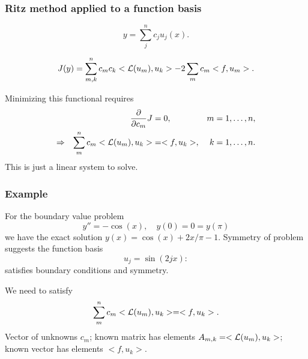 \documentclass{beamer}
\newcommand{\pda}[2]{\frac{\partial{#1}}{\partial{#2}}}
\begin{document}
\begin{frame}
  \frametitle{Ritz method applied to a function basis}

  \begin{equation*}
    y = \sum_j^n c_j u_j(x).
  \end{equation*}

  \begin{equation*}
    J(y) = \sum_{m,k}^n c_m c_k < {\cal L}(u_m), u_k > - 2 \sum_m c_m
    < f, u_m >.
  \end{equation*}

  Minimizing this functional requires
  \begin{align*}
    && \pda{}{c_m} J & = 0, & m = 1, \dots, n, \\
    \Rightarrow && \sum_m^n c_m < {\cal L}(u_m), u_k > & = < f, u_k >,
    & k = 1, \dots, n.
  \end{align*}
  This is just a linear system to solve.

\end{frame}

\begin{frame}
  \frametitle{Example}

  For the boundary value problem
  \begin{equation*}
    y'' = -\cos(x), \quad y(0) = 0 = y(\pi)
  \end{equation*}
  we have the exact solution $y(x) = \cos(x) + 2 x /\pi - 1$. \pause
  Symmetry of problem suggests the function basis
  \begin{equation*}
    u_j = \sin(2 j x):
  \end{equation*}
  satisfies boundary conditions and symmetry. \pause

  \vspace{1ex}

  We need to satisfy
  \begin{equation*}
    \sum_m^n c_m < {\cal L}(u_m), u_k >  = < f, u_k >.
  \end{equation*}
  Vector of unknowns $c_m$; known matrix has elements $A_{m,k} = <
  {\cal L}(u_m), u_k >$; known vector has elements $< f, u_k >$.

\end{frame}
\end{document}
